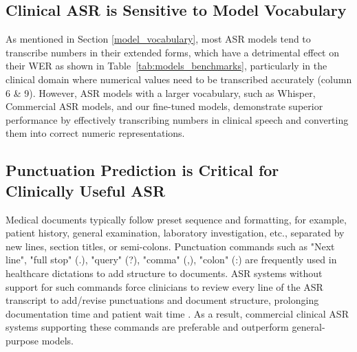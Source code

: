 \documentclass[11pt,a4paper]{article}
\begin{document}
\subsection{Clinical ASR is Sensitive to Model Vocabulary}
As mentioned in Section \ref{model_vocabulary}, most ASR models tend to transcribe numbers in their extended forms, which have a detrimental effect on their WER as shown in Table~\ref{tab:models_benchmarks}, particularly in the clinical domain where numerical values need to be transcribed accurately (column 6 \& 9). However, ASR models with a larger vocabulary, such as Whisper, Commercial ASR models, and our fine-tuned models, demonstrate superior performance by effectively transcribing numbers in clinical speech and converting them into correct numeric representations.

\subsection{Punctuation Prediction is Critical for Clinically Useful ASR} 
Medical documents typically follow preset sequence and formatting, for example, patient history, general examination, laboratory investigation, etc., separated by new lines, section titles, or semi-colons. Punctuation commands such as "Next line", "full stop" (.), "query" (?), "comma" (,), "colon" (:) are frequently used in healthcare dictations to add structure to documents. ASR systems without support for such commands force clinicians to review every line of the ASR transcript to add/revise punctuations and document structure, prolonging documentation time and patient wait time \citep{Sunkara2020}. As a result, commercial clinical ASR systems supporting these commands are preferable and outperform general-purpose models.

\end{document}
